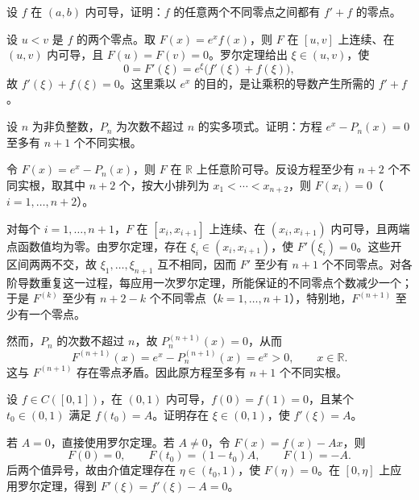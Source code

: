 \begin{example}
\label{ex:rolle-auxiliary-function-and-root-count}
设 $f$ 在 $(a,b)$ 内可导，证明：$f$ 的任意两个不同零点之间都有 $f'+f$ 的零点。
\end{example}

\begin{solve}
设 $u<v$ 是 $f$ 的两个零点。取 $F(x)=e^xf(x)$，则 $F$ 在 $[u,v]$ 上连续、在 $(u,v)$ 内可导，且 $F(u)=F(v)=0$。罗尔定理给出 $\xi\in(u,v)$，使
\[
    0=F'(\xi)=e^\xi\bigl(f'(\xi)+f(\xi)\bigr),
\]
故 $f'(\xi)+f(\xi)=0$。这里乘以 $e^x$ 的目的，是让乘积的导数产生所需的 $f'+f$。
\end{solve}

\begin{example}
\label{ex:rolle-exponential-polynomial-root-count}
设 $n$ 为非负整数，$P_n$ 为次数不超过 $n$ 的实多项式。证明：方程 $e^x-P_n(x)=0$ 至多有 $n+1$ 个不同实根。
\end{example}

\begin{solve}
令 $F(x)=e^x-P_n(x)$，则 $F$ 在 $\mathbb R$ 上任意阶可导。反设方程至少有 $n+2$ 个不同实根，取其中 $n+2$ 个，按大小排列为 $x_1<\cdots<x_{n+2}$，则 $F(x_i)=0$（$i=1,\ldots,n+2$）。

对每个 $i=1,\ldots,n+1$，$F$ 在 $[x_i,x_{i+1}]$ 上连续、在 $(x_i,x_{i+1})$ 内可导，且两端点函数值均为零。由罗尔定理，存在 $\xi_i\in(x_i,x_{i+1})$，使 $F'(\xi_i)=0$。这些开区间两两不交，故 $\xi_1,\ldots,\xi_{n+1}$ 互不相同，因而 $F'$ 至少有 $n+1$ 个不同零点。对各阶导数重复这一过程，每应用一次罗尔定理，所能保证的不同零点个数减少一个；于是 $F^{(k)}$ 至少有 $n+2-k$ 个不同零点（$k=1,\ldots,n+1$），特别地，$F^{(n+1)}$ 至少有一个零点。

然而，$P_n$ 的次数不超过 $n$，故 $P_n^{(n+1)}(x)=0$，从而
\[
    F^{(n+1)}(x)=e^x-P_n^{(n+1)}(x)=e^x>0,
    \qquad x\in\mathbb R.
\]
这与 $F^{(n+1)}$ 存在零点矛盾。因此原方程至多有 $n+1$ 个不同实根。
\end{solve}

\begin{example}
\label{ex:rolle-with-prescribed-interior-value}
设 $f\in C([0,1])$，在 $(0,1)$ 内可导，$f(0)=f(1)=0$，且某个 $t_0\in(0,1)$ 满足 $f(t_0)=A$。证明存在 $\xi\in(0,1)$，使 $f'(\xi)=A$。
\end{example}

\begin{solve}
若 $A=0$，直接使用罗尔定理。若 $A\neq0$，令 $F(x)=f(x)-Ax$，则
\[
    F(0)=0,\qquad F(t_0)=(1-t_0)A,\qquad F(1)=-A.
\]
后两个值异号，故由介值定理存在 $\eta\in(t_0,1)$，使 $F(\eta)=0$。在 $[0,\eta]$ 上应用罗尔定理，得到 $F'(\xi)=f'(\xi)-A=0$。
\end{solve}

